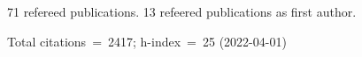 71 refereed publications. 13 refeered publications as first author.

Total citations~=~2417; h-index~=~25 (2022-04-01)
